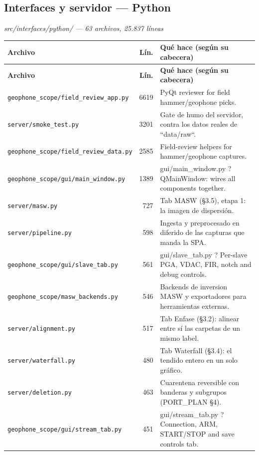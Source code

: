 \subsection{Interfaces y servidor --- Python}
\textit{\small src/interfaces/python/ --- 63 archivos, 25.837 l\'ineas}
\footnotesize
\begin{longtable}{@{}p{5.4cm} r p{8.6cm}@{}}
\toprule \textbf{Archivo} & \textbf{L\'in.} & \textbf{Qu\'e hace (seg\'un su cabecera)} \\ \midrule
\endfirsthead
\toprule \textbf{Archivo} & \textbf{L\'in.} & \textbf{Qu\'e hace (seg\'un su cabecera)} \\ \midrule
\endhead
\bottomrule \endfoot
\texttt{\scriptsize geophone\_scope/field\_review\_app.py} & 6619 & PyQt reviewer for field hammer/geophone picks. \\
\texttt{\scriptsize server/smoke\_test.py} & 3201 & Gate de humo del servidor, contra los datos reales de ``data/raw``. \\
\texttt{\scriptsize geophone\_scope/field\_review\_data.py} & 2585 & Field-review helpers for hammer/geophone captures. \\
\texttt{\scriptsize geophone\_scope/gui/main\_window.py} & 1389 & gui/main\_window.py ? QMainWindow: wires all components together. \\
\texttt{\scriptsize server/masw.py} & 727 & Tab MASW (§3.5), etapa 1: la imagen de dispersión. \\
\texttt{\scriptsize server/pipeline.py} & 598 & Ingesta y preprocesado en diferido de las capturas que manda la SPA. \\
\texttt{\scriptsize geophone\_scope/gui/slave\_tab.py} & 561 & gui/slave\_tab.py ? Per-slave PGA, VDAC, FIR, notch and debug controls. \\
\texttt{\scriptsize geophone\_scope/masw\_backends.py} & 546 & Backends de inversion MASW y exportadores para herramientas externas. \\
\texttt{\scriptsize server/alignment.py} & 517 & Tab Enfase (§3.2): alinear entre sí las carpetas de un mismo label. \\
\texttt{\scriptsize server/waterfall.py} & 480 & Tab Waterfall (§3.4): el tendido entero en un solo gráfico. \\
\texttt{\scriptsize server/deletion.py} & 463 & Cuarentena reversible con banderas y subgrupos (PORT\_PLAN §4). \\
\texttt{\scriptsize geophone\_scope/gui/stream\_tab.py} & 451 & gui/stream\_tab.py ? Connection, ARM, START/STOP and save controls tab. \\

\end{longtable}

